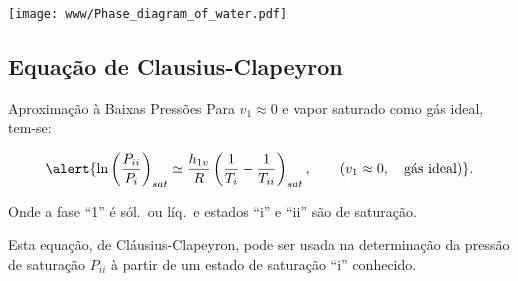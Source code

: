     \begin{frame}\vspace*{-1.0mm}
        \begin{center}
            \texttt{[image: www/Phase\_diagram\_of\_water.pdf]}
        \end{center}
    \end{frame}

\subsection{Equação de Clausius-Clapeyron}

    \begin{frame}{Aproximação à Baixas Pressões}\vspace*{-1.0mm}
        Para \alert{$v_1 \approx 0$} e vapor saturado como \alert{gás ideal}, tem-se:
        \vspace*\medskipamount

        \begin{equation*}
            \alert{
                \ln\left(\frac{P_{ii}}{P_{i}}\right)_{sat} \simeq
                \frac{h_{1v}}{R}\left(\frac{1}{T_i}-\frac{1}{T_{ii}}\right)_{sat},
                \qquad(v_1 \approx 0, \quad\mbox{gás ideal})
            }.
        \end{equation*}\vspace*\medskipamount

        Onde a fase ``\alert{1}'' é \alert{sól.}~ou \alert{líq.}~e estados ``\alert{i}'' e
        ``\alert{ii}'' são de saturação.\vspace*\medskipamount

        Esta equação, de \alert{Cláusius-Clapeyron}, pode ser usada na determinação da pressão
        de saturação \alert{$P_{ii}$} à partir de um estado de saturação ``\alert{i}''
        conhecido.
    \end{frame}

